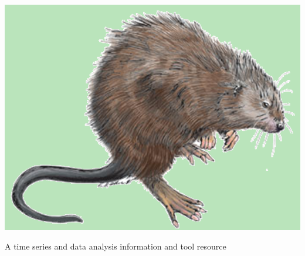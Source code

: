 \documentclass[serif]{beamer}\usepackage[]{graphicx}\usepackage[]{color}
\begin{document}
\begin{frame}{\includegraphics[width=0.05\paperwidth]{fig/muskrat.png}\hspace{0.07in}{\bf SWMPrats.net}}
\centerline{A time series and data analysis information and tool resource}
\hspace{0.2in}
\centerline{}
\end{frame}
\end{document}

